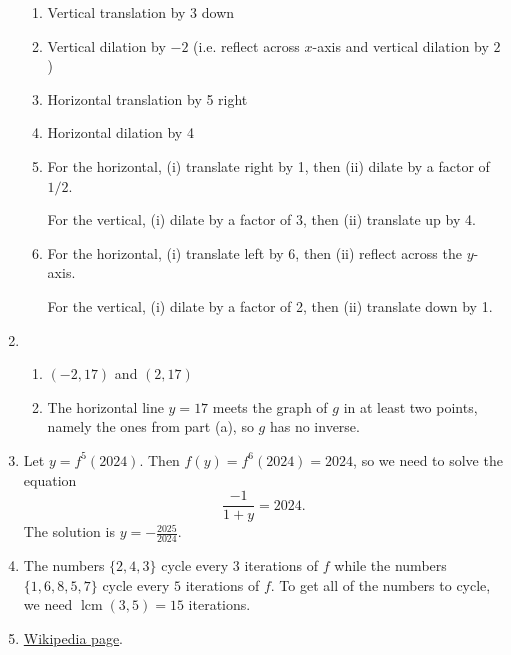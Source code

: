\begin{enumerate}
\begin{enumerate}
\item Vertical translation by 3 down
\item Vertical dilation by $-2$ (i.e. reflect across $x$-axis and vertical dilation by $2$)
\item Horizontal translation by 5 right
\item Horizontal dilation by 4
\item For the horizontal, (i) translate right by 1, then (ii) dilate by a factor of $1/2$.\par
For the vertical, (i) dilate by a factor of 3, then (ii) translate up by 4.
\item For the horizontal, (i) translate left by 6, then (ii) reflect across the $y$-axis.\par 
For the vertical, (i) dilate by a factor of 2, then (ii) translate down by 1.
\end{enumerate}
\item \begin{enumerate}
\item $(-2, 17)$ and $(2, 17)$
\item The horizontal line $y = 17$ meets the graph of $g$ in at least two points, namely the ones from part (a), so $g$ has no inverse.
\end{enumerate}
\item Let $y = f^5(2024)$. Then $f(y) = f^6(2024) = 2024$, so we need to solve the equation
\begin{equation*}
\frac{-1}{1 + y} = 2024.
\end{equation*}
The solution is $y = -\tfrac{2025}{2024}$.
\item The numbers $\{2, 4, 3\}$ cycle every $3$ iterations of $f$ while the numbers $\{1, 6, 8, 5, 7\}$ cycle every $5$ iterations of $f$. To get all of the numbers to cycle, we need $\operatorname{lcm}(3,5) = \boxed{15}$ iterations.
\item \href{https://en.wikipedia.org/wiki/Thomae\%27s_function}{Wikipedia page}.
\end{enumerate}